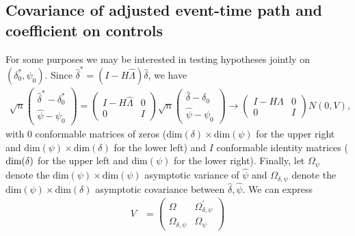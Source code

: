 \documentclass[bib]{./sty/statapress}
\begin{document}
\subsection{Covariance of adjusted event-time path and coefficient on controls}

For some purposes we may be interested in testing hypotheses jointly on $\left(\delta_{0}^{*},\psi_{0}\right)$.
Since $\widehat{\delta}^{*}=(I-H\widehat{\Lambda})\widehat{\delta}$, we have
\begin{align*}
\sqrt{n}\begin{pmatrix}\widehat{\delta}^{*}-\delta_{0}^{*}\\
\widehat{\psi}-\psi_{0}
\end{pmatrix}=\begin{pmatrix}I-H\widehat{\Lambda} & 0\\
0 & I
\end{pmatrix}\sqrt{n}\begin{pmatrix}\widehat{\delta}-\delta_{0}\\
\widehat{\psi}-\psi_{0}
\end{pmatrix}\to\begin{pmatrix}I-H\Lambda & 0\\
0 & I
\end{pmatrix}N(0,V),
\end{align*}
with $0$ conformable matrices of zeros ($\text{dim}(\delta)\times\text{dim}(\psi)$
for the upper right and $\text{dim}(\psi)\times\text{dim}(\delta)$
for the lower left) and $I$ conformable identity matrices ($\text{dim\ensuremath{\left(\delta\right)}}$
for the upper left and $\text{dim}\left(\psi\right)$ for the lower
right). Finally, let $\Omega_{\psi}$ denote the $\text{dim}(\psi)\times\text{dim}(\psi)$
asymptotic variance of $\widehat{\psi}$ and $\Omega_{\delta,\psi}$
denote the $\text{dim}(\psi)\times\text{dim}(\delta)$ asymptotic
covariance between $\widehat{\delta},\widehat{\psi}$. We can express
\begin{align*}
V & =\begin{pmatrix}\Omega & \Omega_{\delta,\psi}^{\prime}\\
\Omega_{\delta,\psi} & \Omega_{\psi}
\end{pmatrix}
\end{align*}
\end{document}
